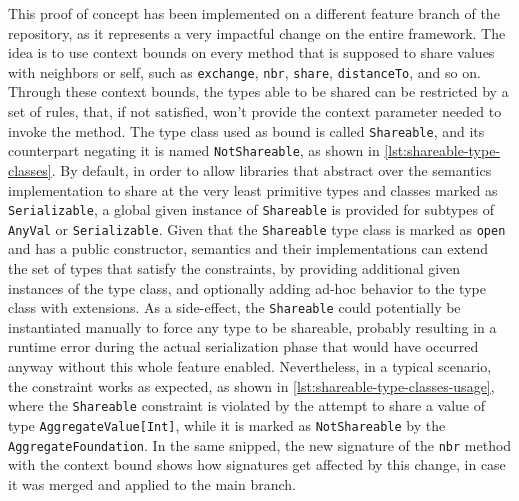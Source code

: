 This proof of concept has been implemented on a different feature branch of the repository, as it represents a very impactful change on the entire framework.
%
The idea is to use context bounds on every method that is supposed to share values with neighbors or self, such as \texttt{exchange}, \texttt{nbr}, \texttt{share}, \texttt{distanceTo}, and so on.
%
Through these context bounds, the types able to be shared can be restricted by a set of rules, that, if not satisfied, won't provide the context parameter needed to invoke the method.
%
The type class used as bound is called \texttt{Shareable}, and its counterpart negating it is named \texttt{NotShareable}, as shown in \cref{lst:shareable-type-classes}.
%
By default, in order to allow libraries that abstract over the semantics implementation to share at the very least primitive types and classes marked as \texttt{Serializable}, a global given instance of \texttt{Shareable} is provided for subtypes of \texttt{AnyVal} or \texttt{Serializable}.
%
Given that the \texttt{Shareable} type class is marked as \texttt{open} and has a public constructor, semantics and their implementations can extend the set of types that satisfy the constraints, by providing additional given instances of the type class, and optionally adding ad-hoc behavior to the type class with extensions.
%
As a side-effect, the \texttt{Shareable} could potentially be instantiated manually to force any type to be shareable, probably resulting in a runtime error during the actual serialization phase that would have occurred anyway without this whole feature enabled.
%
Nevertheless, in a typical scenario, the constraint works as expected, as shown in \cref{lst:shareable-type-classes-usage}, where the \texttt{Shareable} constraint is violated by the attempt to share a value of type \texttt{AggregateValue[Int]}, while it is marked as \texttt{NotShareable} by the \texttt{AggregateFoundation}.
%
In the same snipped, the new signature of the \texttt{nbr} method with the context bound shows how signatures get affected by this change, in case it was merged and applied to the main branch.






